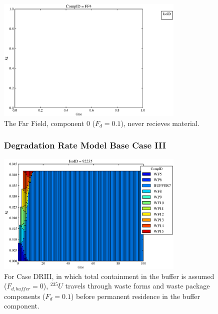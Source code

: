 \begin{frame}
\begin{figure}
\begin{minipage}[b]{0.45\linewidth}
  \includegraphics[width=0.8\textwidth]{./images/drII0.eps}
  \caption[Case DRII Far Field Contaminants.]{ 
    The Far Field, component 0 ($F_d = 0.1$), never recieves material.
    }
  \label{fig:drIIff0}


  \end{minipage}
\end{figure}
\end{frame}

\begin{frame}[ctb!]
\begin{figure}[ht]
  \frametitle{Degradation Rate Model Base Case III}
\centering
\includegraphics[width=0.8\textwidth]{./images/drIII.eps}
\caption[$^{235}U$ residence. Degradation Rate Buffer No Release.]{
For Case DRIII, in which total containment in the buffer is assumed ($F_{d,buffer}=0$), 
$^{235}U$ travels through waste forms and waste package components ($F_d = 0.1$) before 
permanent residence in the buffer component.
}
\label{fig:drIIIall}
\end{figure}
\end{frame}

